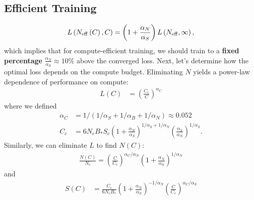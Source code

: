 \documentclass[english]{article}
\begin{document}
\subsection{Efficient Training}

\begin{equation}
L\left(N_{{\rm eff}}\left(C\right),C\right)=\left(1+\frac{\alpha_{N}}{\alpha_{S}}\right)L\left(N_{{\rm eff}},\infty\right),
\end{equation}
which implies that for compute-efficient training, we should train to a \textbf{fixed percentage} $\frac{\alpha_{N}}{\alpha_{S}}\approx10\%$ above the converged loss.
Next, let's determine how the optimal loss depends on the compute budget. Eliminating $N$ yields a power-law dependence of performance on compute:
\begin{align}
L\left(C\right) & =\left(\frac{C_{c}}{C}\right)^{\alpha_{C}}
\end{align}
where we defined
\begin{align}
\alpha_{C} & =1/\left(1/\alpha_{S}+1/\alpha_{B}+1/\alpha_{N}\right)\approx0.052\\
C_{c} & =6N_{c}B_{\ast}S_{c}\left(1+\frac{\alpha_{N}}{\alpha_{S}}\right)^{1/\alpha_{S}+1/\alpha_{N}}\left(\frac{\alpha_{S}}{\alpha_{N}}\right)^{1/\alpha_{S}}.
\end{align}
Similarly, we can eliminate $L$ to find $N\left(C\right)$:
\begin{align}
\frac{N\left(C\right)}{N_{c}}=\left(\frac{C}{C_{c}}\right)^{\alpha_{C}/\alpha_{N}}\left(1+\frac{\alpha_{N}}{\alpha_{S}}\right)^{1/\alpha_{N}}
\end{align}
and
\begin{align}
S\left(C\right) & =\frac{C_{c}}{6N_{c}B_{\ast}}\left(1+\frac{\alpha_{N}}{\alpha_{S}}\right)^{-1/\alpha_{N}}\left(\frac{C}{C_{c}}\right)^{\alpha_{C}/\alpha_{S}}
\end{align}
\end{document}
